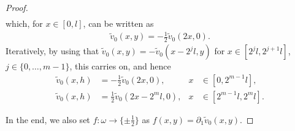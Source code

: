 \documentclass[a4paper, 10pt, twoside, notitlepage]{amsart}
\theoremstyle{plain}
\newcommand{\p}{\partial}
\begin{document}
\begin{proof}
\begin{align*}
                          \end{align*}
                          which, for $x\in [0,l]$, can be written as
                          \begin{align*}
                            \tilde{v}_0(x,y) = - \frac{1}{2} \tilde{v}_0(2x,0).
                          \end{align*}
                          Iteratively, by using that $\tilde{v}_0(x,y) = -\tilde{v}_0(x-2^jl,y)$ for $x \in [2^jl,2^{j+1}l]$, $j\in\{0,\dots,m-1\}$, this carries on, and hence
                          \begin{align*}
                            \tilde{v}_0(x,h) &= - \frac{1}{2} \tilde{v}_0(2x,0), & x &\in [0,2^{m-1}l], \\
                            \tilde{v}_0(x,h) &= \frac{1}{2} \tilde{v}_0(2x-2^ml,0), & x &\in [2^{m-1}l,2^ml].
                          \end{align*}
                        
In the end, we also set $f:\omega\to\{\pm\frac{1}{2}\}$ as $f(x,y)=\p_1\tilde v_0(x,y)$.





                        
                        

\end{proof}
\end{document}
